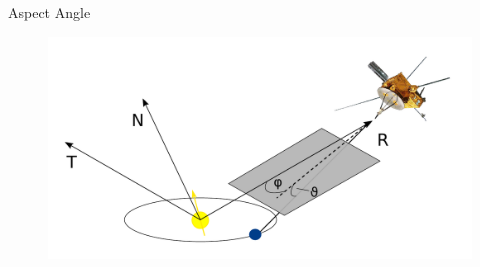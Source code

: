 \documentclass{beamer}
\begin{document}
\begin{frame}{Aspect Angle}
\begin{figure}
	\includegraphics[scale=0.5]{Pics/RTN_AA_angles.pdf}
\end{figure}
\end{frame}
\end{document}
